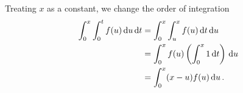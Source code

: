 \begin{solution}
\begin{adjustbox}{valign=T,raise=\strutheight,minipage={\linewidth}}
  \begin{wrapfigure}{r}{0.35\textwidth}
    \centering
{}
\end{wrapfigure}
\strut{}
Treating $x$ as a constant, we change the order of integration
\begin{align*}
\int_0^x \int_0^t f(u) \,\mathrm{d} u \,\mathrm{d} t 
&= \int_0^x \int_u^x f(u) \,\mathrm{d} t \,\mathrm{d} u \\
&= \int_0^x f(u) \left( \int_0^x 1 \,\mathrm{d} t \right) \,\mathrm{d} u \\
&= \int_0^x (x-u) f(u) \,\mathrm{d} u\,.
\end{align*}
\end{adjustbox}
\end{solution}


